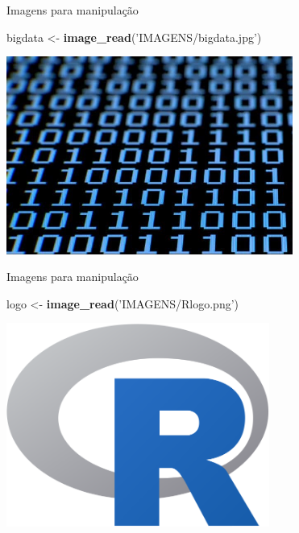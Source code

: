 \documentclass[
  ignorenonframetext,
]{beamer}
\newenvironment{Shaded}{\begin{snugshade}}{\end{snugshade}}
\newcommand{\KeywordTok}[1]{\textcolor[rgb]{0.13,0.29,0.53}{\textbf{#1}}}
\newcommand{\NormalTok}[1]{#1}
\newcommand{\StringTok}[1]{\textcolor[rgb]{0.31,0.60,0.02}{#1}}
\begin{document}
\begin{frame}[fragile]{Imagens para manipulação}
\protect\hypertarget{imagens-para-manipulauxe7uxe3o-1}{}

\small

\begin{Shaded}
\begin{Highlighting}[]
\NormalTok{bigdata <-}\StringTok{ }\KeywordTok{image_read}\NormalTok{(}\StringTok{'IMAGENS/bigdata.jpg'}\NormalTok{)}
\end{Highlighting}
\end{Shaded}

\includegraphics[width=3.7in]{IMAGENS/bigdata}

\begin{center}
\tiny{}
\end{center}

\end{frame}

\begin{frame}[fragile]{Imagens para manipulação}
\protect\hypertarget{imagens-para-manipulauxe7uxe3o-2}{}

\small

\begin{Shaded}
\begin{Highlighting}[]
\NormalTok{logo <-}\StringTok{ }\KeywordTok{image_read}\NormalTok{(}\StringTok{'IMAGENS/Rlogo.png'}\NormalTok{)}
\end{Highlighting}
\end{Shaded}

\includegraphics[width=3.4in]{IMAGENS/Rlogo}

\begin{center}
\tiny{}
\end{center}

\end{frame}
\end{document}
